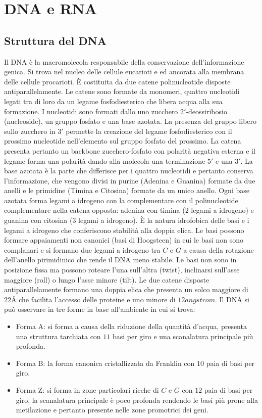 \chapter{DNA e RNA}
\section{Struttura del DNA}
Il DNA \`e la macromolecola responsabile della conservazione dell'informazione genica. Si trova nel nucleo delle cellule eucarioti e ed ancorata alla membrana delle cellule procarioti.
\`E costituita da due catene polinucleotide disposte antiparallelamente. Le catene sono formate da monomeri, quattro nucleotidi legati tra di loro da un legame fosfodiesterico che
libera acqua alla sua formazione. I nucleotidi sono formati dallo uno zucchero $2'$-deossiribosio (nucleoside), un gruppo fosfato e una base azotata. La presenza del gruppo  
libero sullo zucchero in $3'$ permette la creazione del legame fosfodiesterico con il prossimo nucleotide nell'elemento  sul gruppo fosfato del prossimo. La catena presenta 
pertanto un backbone zucchero-fosfato con polarit\`a negativa esterna e il legame forma una polarit\`a dando alla molecola una terminazione $5'$ e una $3'$. La base azotata \`e la parte 
che differisce per i quattro nucleotidi e pertanto conserva l'informazione, che vengono divisi in purine (Adenina e Guanina) formate da due anelli e le primidine (Timina e Citosina) 
formate da un unico anello. Ogni base azotata forma legami a idrogeno con la complementare con il polinucleotide complementare nella catena opposta: adenina con timina ($2$ legami a 
idrogeno) e guanina con citosina ($3$ legami a idrogeno). \`E la natura idrofobica delle basi e i legami a idrogeno che conferiscono stabilit\`a alla doppia elica. Le basi possono 
formare appaiamenti non canonici (basi di Hoogsteen) in cui le basi non sono complanari e si formano due legami a idrogeno tra $C$ e $G$ a causa della rotazione dell'anello pirimidinico 
che rende il DNA meno stabile. Le basi non sono in posizione fissa ma possono roteare l'una sull'altra (twist), inclinarsi sull'asse maggiore (roll) o lungo l'asse minore (tilt). Le due
catene disposte antiparallelamente formano una doppia elica che presenta un solco maggiore di $22\si{\angstrom}$ che facilita l'accesso delle proteine e uno minore di $12\si{angstrom}$.
Il DNA si pu\`o osservare in tre forme in base all'ambiente in cui si trova:
\begin{itemize}
	\item Forma A: si forma a causa della riduzione della quantit\`a d'acqua, presenta una struttura tarchiata con $11$ basi per giro e una scanalatura principale pi\`u profonda.
	\item Forma B: la forma canonica cristallizzata da Franklin con $10$ paia di basi per giro.
	\item Forma Z: si forma in zone particolari ricche di $C$ e $G$ con $12$ paia di basi per giro, la scanalatura principale \`e poco profonda rendendo le basi pi\`u prone alla
		metilazione e pertanto presente nelle zone promotrici dei geni.
\end{itemize}
